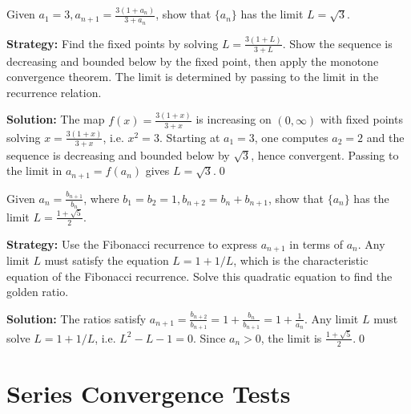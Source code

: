 \begin{problembox}
\begin{problemstatement}
Given \(a_1 = 3, a_{n+1} = \frac{3(1 + a_n)}{3 + a_n}\), show that \(\{a_n\}\) has the limit \(L = \sqrt{3}\).
\end{problemstatement}
\end{problembox}

\noindent\textbf{Strategy:} Find the fixed points by solving \(L=\frac{3(1+L)}{3+L}\). Show the sequence is decreasing and bounded below by the fixed point, then apply the monotone convergence theorem. The limit is determined by passing to the limit in the recurrence relation.

\bigskip\noindent\textbf{Solution:}
The map \(f(x)=\tfrac{3(1+x)}{3+x}\) is increasing on \((0,\infty)\) with fixed points solving \(x=\tfrac{3(1+x)}{3+x}\), i.e. \(x^2=3\). Starting at \(a_1=3\), one computes \(a_2=2\) and the sequence is decreasing and bounded below by \(\sqrt{3}\), hence convergent. Passing to the limit in \(a_{n+1}=f(a_n)\) gives \(L=\sqrt{3}\).\qed


\begin{problembox}
\begin{problemstatement}
Given \(a_n = \frac{b_{n+1}}{b_n}\), where \(b_1 = b_2 = 1, b_{n+2} = b_n + b_{n+1}\), show that \(\{a_n\}\) has the limit \(L = \frac{1 + \sqrt{5}}{2}\).
\end{problemstatement}
\end{problembox}

\noindent\textbf{Strategy:} Use the Fibonacci recurrence to express \(a_{n+1}\) in terms of \(a_n\). Any limit \(L\) must satisfy the equation \(L=1+1/L\), which is the characteristic equation of the Fibonacci recurrence. Solve this quadratic equation to find the golden ratio.

\bigskip\noindent\textbf{Solution:}
The ratios satisfy \(a_{n+1}=\tfrac{b_{n+2}}{b_{n+1}}=1+\tfrac{b_n}{b_{n+1}}=1+\tfrac{1}{a_n}\). Any limit \(L\) must solve \(L=1+1/L\), i.e. \(L^2-L-1=0\). Since \(a_n>0\), the limit is \(\tfrac{1+\sqrt{5}}{2}\).\qed
\section{Series Convergence Tests}



